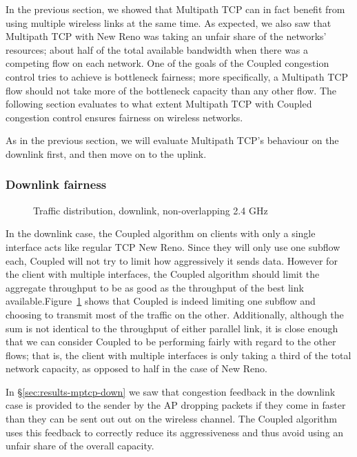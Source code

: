 In the previous section, we showed that Multipath TCP can in fact benefit from
using multiple wireless links at the same time. As expected, we also saw that
Multipath TCP with New Reno was taking an unfair share of the networks'
resources; about half of the total available bandwidth when there was a
competing flow on each network. One of the goals of the Coupled congestion 
control tries to achieve is bottleneck fairness; more specifically, a 
Multipath TCP flow should not take more of the bottleneck capacity than any 
other flow. The following section evaluates to what extent Multipath TCP with 
Coupled congestion control ensures fairness on wireless networks.

As in the previous section, we will evaluate Multipath TCP's behaviour on the
downlink first, and then move on to the uplink.

\subsubsection{Downlink fairness}

\begin{figure}[h]
 \centering
 
 \caption{Traffic distribution, downlink, non-overlapping 2.4 GHz}\label{graph:down-fair}
\end{figure}

In the downlink case, the Coupled algorithm on clients with only a single 
interface acts like regular TCP New Reno. Since they will only use one subflow 
each, Coupled will not try to limit how aggressively it sends data. However for 
the client with multiple interfaces, the Coupled algorithm should limit the 
aggregate throughput to be as good as the throughput of the best link
available.\@ Figure~\ref{graph:down-fair} shows that Coupled is indeed limiting 
one subflow and choosing to transmit most of the traffic on the other. 
Additionally, although the sum is not identical to the throughput of either 
parallel link, it is close enough that we can consider Coupled to be performing 
fairly with regard to the other flows; that is, the client with multiple 
interfaces is only taking a third of the total network capacity, as opposed to 
half in the case of New Reno.


In \S\ref{sec:results-mptcp-down} we saw that congestion feedback in the 
downlink case is provided to the sender by the AP dropping packets if they
come in faster than they can be sent out out on the wireless channel. The
Coupled algorithm uses this feedback to correctly reduce its aggressiveness and 
thus avoid using an unfair share of the overall capacity.

